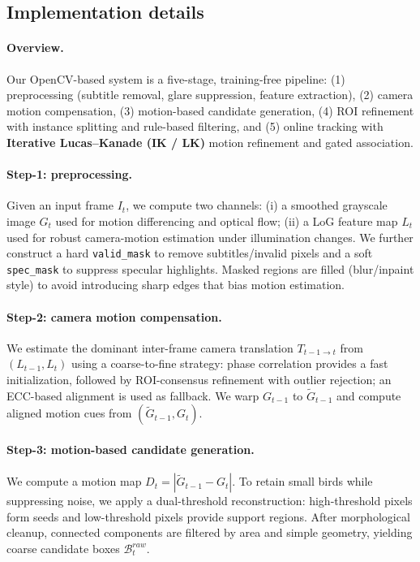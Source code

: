 \subsection{Implementation details}
\label{sec:exp_impl}


\paragraph{Overview.}
Our OpenCV-based system is a five-stage, training-free pipeline:
(1) preprocessing (subtitle removal, glare suppression, feature extraction),
(2) camera motion compensation,
(3) motion-based candidate generation,
(4) ROI refinement with instance splitting and rule-based filtering,
and (5) online tracking with \textbf{Iterative Lucas--Kanade (IK / LK)} motion refinement and gated association.

\paragraph{Step-1: preprocessing.}
Given an input frame $I_t$, we compute two channels:
(i) a smoothed grayscale image $G_t$ used for motion differencing and optical flow;
(ii) a LoG feature map $L_t$ used for robust camera-motion estimation under illumination changes.
We further construct a hard \texttt{valid\_mask} to remove subtitles/invalid pixels and a soft \texttt{spec\_mask} to suppress specular highlights.
Masked regions are filled (blur/inpaint style) to avoid introducing sharp edges that bias motion estimation.

\paragraph{Step-2: camera motion compensation.}
We estimate the dominant inter-frame camera translation $T_{t-1\rightarrow t}$ from $(L_{t-1},L_t)$ using a coarse-to-fine strategy:
phase correlation provides a fast initialization, followed by ROI-consensus refinement with outlier rejection; an ECC-based alignment is used as fallback.
We warp $G_{t-1}$ to $\tilde{G}_{t-1}$ and compute aligned motion cues from $(\tilde{G}_{t-1}, G_t)$.

\paragraph{Step-3: motion-based candidate generation.}
We compute a motion map $D_t = |\tilde{G}_{t-1}-G_t|$.
To retain small birds while suppressing noise, we apply a dual-threshold reconstruction:
high-threshold pixels form seeds and low-threshold pixels provide support regions.
After morphological cleanup, connected components are filtered by area and simple geometry, yielding coarse candidate boxes $\mathcal{B}_t^{raw}$.


